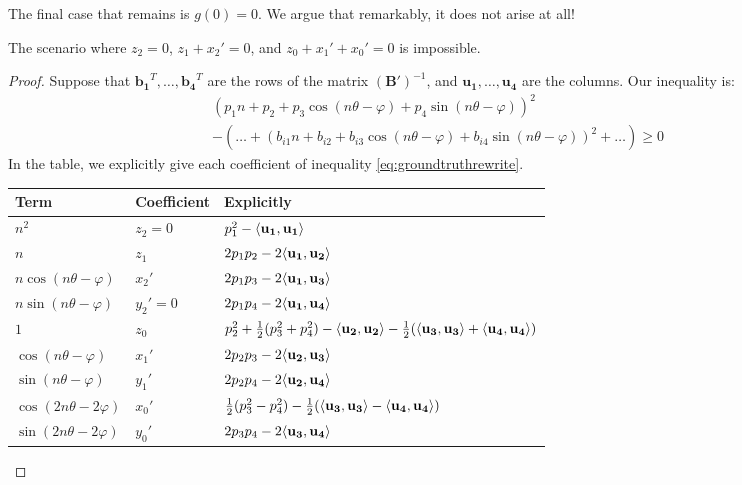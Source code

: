 The final case that remains is $g(0) = 0$. We argue that remarkably, it does not arise at all!
\begin{lemma}
The scenario where $z_2 = 0$, $z_1 + x_2' = 0$, and $z_0 + x_1'+ x_0' = 0$ is impossible.
\end{lemma}
\begin{proof}
Suppose that $\mathbf{b_1}^T, \dots, \mathbf{b_4}^T$ are the rows of the matrix $(\mathbf{B'})^{-1}$, and $\mathbf{u_1}, \dots, \mathbf{u_4}$ are the columns. Our inequality is:
\begin{align*}
(p_1 n + p_2 + p_3\cos(n\theta - \varphi) + p_4\sin(n\theta - \varphi))^2 \\
- \left( \dots + (b_{i1} n + b_{i2} + b_{i3}\cos(n\theta - \varphi) + b_{i4}\sin(n\theta - \varphi))^2 + \dots \right) \ge 0
\end{align*}
In the table, we explicitly give each coefficient of inequality \ref{eq:groundtruthrewrite}.
\begin{table}[H]
\begin{tabular}{|l|l|l|}
  \hline
   \textbf{Term}& \textbf{Coefficient}& {\bf Explicitly} \\
  \hline
  $n^2$ & $z_2 = 0$ & $p_1^2 - \langle\mathbf{u_1}, \mathbf{u_1}\rangle$ \\
   \hline
  $n$ & $z_1$ & $2p_1p_2 - 2\langle\mathbf{u_1}, \mathbf{u_2}\rangle$ \\
   \hline
  $n\cos (n\theta - \varphi)$ & $x_2'$ & $2p_1p_3 - 2\langle\mathbf{u_1}, \mathbf{u_3}\rangle$ \\
   \hline
  $n\sin (n\theta - \varphi)$ & $y_2' = 0$ & $2p_1p_4 - 2\langle\mathbf{u_1}, \mathbf{u_4}\rangle$ \\
   \hline
  $1$ & $z_0$ & $p_2^2 + \frac{1}{2}(p_3^2 + p_4^2) - \langle\mathbf{u_2}, \mathbf{u_2}\rangle - \frac{1}{2}
 (\langle\mathbf{u_3}, \mathbf{u_3}\rangle + \langle\mathbf{u_4}, \mathbf{u_4}\rangle)$ \\
  \hline
  $\cos (n\theta-\varphi)$ & $x_1'$ & $2p_2p_3 - 2\langle\mathbf{u_2}, \mathbf{u_3}\rangle$ \\
   \hline
  $\sin (n\theta-\varphi)$ & $y_1'$ & $2p_2p_4 - 2\langle\mathbf{u_2}, \mathbf{u_4}\rangle$ \\
   \hline
  $\cos (2n\theta - 2\varphi)$ & $x_0'$ & $\frac{1}{2}(p_3^2 - p_4^2) - \frac{1}{2}(\langle\mathbf{u_3}, \mathbf{u_3}\rangle - \langle\mathbf{u_4}, \mathbf{u_4}\rangle)$ \\
   \hline
  $\sin (2n\theta - 2\varphi)$ & $y_0'$ & $2p_3p_4 - 2\langle\mathbf{u_3}, \mathbf{u_4}\rangle$ \\
  \hline
\end{tabular}

\end{table}
\end{proof}

